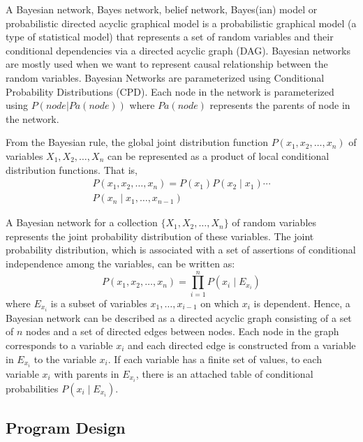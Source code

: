 \documentclass{gapd}
\begin{document}
A Bayesian network, Bayes network, belief network, Bayes(ian) model or
probabilistic directed acyclic graphical model is a probabilistic
graphical model (a type of statistical model) that represents a set of
random variables and their conditional dependencies via a directed
acyclic graph (DAG). Bayesian networks are mostly used when we want to
represent causal relationship between the random variables. Bayesian
Networks are parameterized using Conditional Probability Distributions
(CPD). Each node in the network is parameterized using $ P(node | Pa(node)) $ where $Pa(node) $ represents the parents of node in the network.

From the Bayesian rule, the global joint distribution function 
$P\left(x_{1}, x_{2}, \ldots, x_{n}\right)$ of variables $X_{1}, X_{2}, \ldots, X_{n}$ 
can be represented as a product of local conditional distribution functions. That is,
\begin{equation*}
  \begin{aligned}
  P\left(x_{1}, x_{2}, \ldots, x_{n}\right) =  P\left(x_{1}\right) P\left(x_{2} \mid x_{1}\right) \cdots \\ 
  P\left(x_{n} \mid x_{1}, \ldots, x_{n-1}\right) 
  \end{aligned}  
\end{equation*}

A Bayesian network for a collection $\{X_{1}, X_{2}, \ldots, X_{n}\}$ of random variables
represents the joint probability distribution of these variables.
The joint probability distribution, which is associated with a set of assertions of conditional independence among the variables, can be written as:
$$
P\left(x_{1}, x_{2}, \ldots, x_{n}\right)=\prod_{i=1}^{n} P\left(x_{i} \mid E_{x_{i}}\right)
$$
where $E_{x_{i}}$ is a subset of variables $x_{1}, \ldots, x_{i-1}$
on which $x_{i}$ is dependent.
Hence, a Bayesian network can be described as a directed acyclic
graph consisting of a set of $n$ nodes and a set of
directed edges between nodes. 
Each node in the graph corresponds to a variable $x_{i}$ and 
each directed edge is constructed from a variable 
in $E_{x_{i}}$ to the variable $x_{i} .$ 
If each variable has a finite set of values, to each variable
$x_{i}$ with parents in $E_{x_{i}}$, 
there is an attached table of conditional probabilities 
$P\left(x_{i} \mid E_{x_{i}}\right) .$

\subsection{Program Design}\label{program-design}
\end{document}
